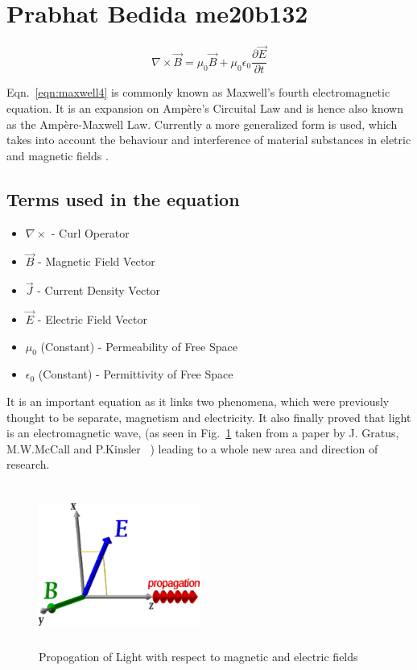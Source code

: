 \section{Prabhat Bedida me20b132}

\begin{equation}
\nabla\times\vec{B} = \mu_0\vec{B} + \mu_0\epsilon_0 \frac{\partial \vec{E}}{\partial t}
\label{eqn:maxwell4}
\end{equation}

Eqn.~\ref{eqn:maxwell4} is commonly known as Maxwell's fourth electromagnetic equation. It is an expansion on Amp\`{e}re's Circuital Law and is hence also known as the Amp\`{e}re-Maxwell Law. Currently a more generalized form is used, which takes into account the behaviour and interference of material substances in eletric and magnetic fields \cite{Gratus2020}.

\subsection{Terms used in the equation}
\begin{itemize}
\item $\nabla\times$ - Curl Operator
\item $\vec{B}$ - Magnetic Field Vector
\item $\vec{J}$ - Current Density Vector
\item $\vec{E}$ - Electric Field Vector
\item $\mu_0$ (Constant) - Permeability of Free Space
\item $\epsilon_0$ (Constant) - Permittivity of Free Space
\end{itemize}

It is an important equation as it links two phenomena, which were previously thought to be separate, magnetism and electricity. It also finally proved that light is an electromagnetic wave, (as seen in Fig.~\ref{fig:light} taken from a paper by J. Gratus, M.W.McCall and P.Kinsler ~\cite{Gratus2020}) leading to a whole new area and direction of research.

\begin{figure}[h]
\centerline{\includegraphics[width=200px,height=200px]{me20b132/me20b132.eps}}
\caption{Propogation of Light with respect to magnetic and electric fields}
\label{fig:light}
\end{figure} 


